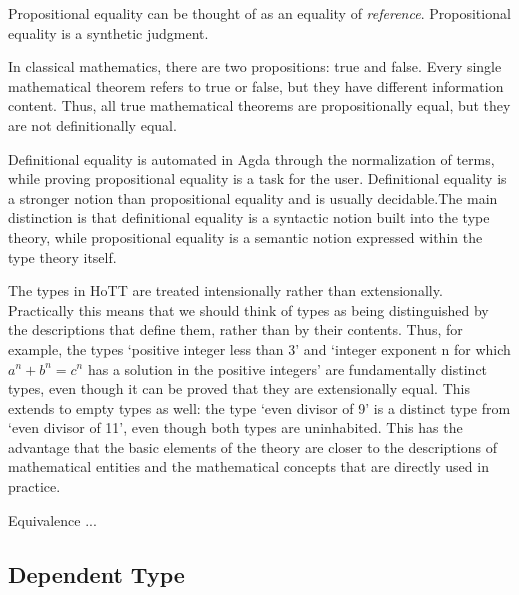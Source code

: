 \documentclass{article}
\begin{document}
\begin{remark}[?]
  Propositional equality can be thought of as an equality of \emph{reference}. Propositional equality is a synthetic judgment.
\end{remark}

\begin{example}[?]
 In classical mathematics, there are two propositions: true and false. Every single mathematical theorem refers to true or false, but they have different information content. Thus, all true mathematical theorems are propositionally equal, but they are not definitionally equal.
\end{example}

\begin{remark}
  Definitional equality is automated in Agda through the normalization of terms, while proving propositional equality is a task for the user. Definitional equality is a stronger notion than propositional equality and is usually decidable.The main distinction is that definitional equality is a syntactic notion built into the type theory, while propositional equality is a semantic notion expressed within the type theory itself.
\end{remark}

\begin{remark}
  The types in HoTT are treated intensionally rather than extensionally. Practically this means that we should think of types as being distinguished by the descriptions that define them, rather than by their contents. Thus, for example, the types ‘positive integer less than 3’ and ‘integer exponent n for which $a^n + b^n = c^n$ has a solution in the positive integers’ are fundamentally distinct types, even though it can be proved that they are extensionally equal. This extends to empty types as well: the type ‘even divisor of 9’ is a distinct type from ‘even divisor of 11’, even though both types are uninhabited. This has the advantage that the basic elements of the theory are closer to the descriptions of mathematical entities and the mathematical concepts that are directly used in practice.
\end{remark}

\begin{definition}
Equivalence ...
\end{definition}

\subsection{Dependent Type}
\end{document}
